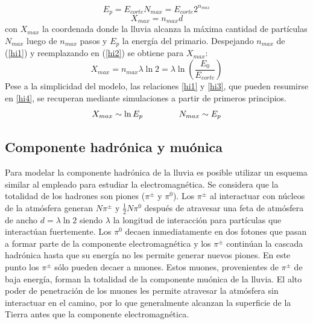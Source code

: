 %
\begin{equation}
\label{hi1}
E_p = E_{corte} N_{max} = E_{corte} 2^{n_{max}}
\end{equation}
%
\begin{equation}
\label{hi2}
X_{max}=n_{max} d
\end{equation}
%
con $X_{max}$ la coordenada donde la lluvia alcanza la máxima cantidad de partículas $N_{max}$ luego de $n_{max}$ pasos y $E_p$ la energía del primario.
Despejando $n_{max}$ de (\ref{hi1}) y reemplazando en (\ref{hi2}) se obtiene para $X_{max}$:
%
\begin{equation}
\label{hi3}
X_{max} = n_{max} \lambda \ln2=\lambda \ln\left(\frac{E_{0}}{E_{corte}}\right)
\end{equation}
%
Pese a la simplicidad del modelo, las relaciones \ref{hi1} y \ref{hi3}, que pueden resumirse en \ref{hi4}, se recuperan mediante simulaciones a partir de primeros principios.
%
\begin{equation}
\label{hi4}
X_{max} \sim \ln E_{p}
\hspace*{15mm}
N_{max} \sim E_p
\end{equation}
%

\subsection{Componente hadrónica y muónica}

Para modelar la componente hadrónica de la lluvia es posible utilizar un esquema similar al empleado para estudiar la electromagnética.
Se considera que la totalidad de los hadrones son piones ($\pi^{\pm}$ y $\pi^{0}$). Los $\pi^{\pm}$ al interactuar con n\'ucleos de la atm\'osfera generan $N \pi^{\pm}$ y $\frac{1}{2}N \pi^{0}$ después de atravesar una feta de atmósfera de ancho $d=\lambda \ln2$ siendo $\lambda$ la longitud de interacción para partículas que interactúan fuertemente.
Los $\pi^{0}$ decaen inmediatamente en dos fotones que pasan a formar parte de la componente electromagnética y los $\pi^{\pm}$ continúan la cascada hadrónica hasta que su energía no les permite generar nuevos piones.
En este punto los $\pi^{\pm}$ s\'olo pueden decaer a muones.
Estos muones, provenientes de $\pi^{\pm}$ de baja energía, forman la totalidad de la componente muónica de la lluvia.
El alto poder de penetración de los muones les permite atravesar la atmósfera sin interactuar en el camino, por lo que generalmente alcanzan la superficie de la Tierra antes que la componente electromagnética.

